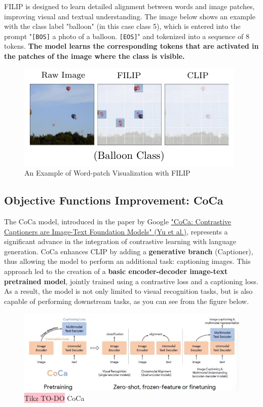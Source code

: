 FILIP is designed to learn detailed alignment between words and image patches, improving visual and textual understanding. The image below shows an example with the class label "balloon" (in this case class 5), which is entered into the prompt "\texttt{[BOS]} a photo of a balloon. \texttt{[EOS]}" and tokenized into a sequence of 8 tokens. \textbf{The model learns the corresponding tokens that are activated in the patches of the image where the class is visible.} 

\begin{figure}[!htbp]
    \centering
    \includegraphics[width=0.8\linewidth]{tikz/chapter11 - FILIP vs CLIP.pdf}
    \caption{An Example of Word-patch Visualization with FILIP}
\end{figure}


\subsection{Objective Functions Improvement: CoCa}

The CoCa model, introduced in the paper by Google \href{https://arxiv.org/pdf/2205.01917}{"CoCa: Contrastive Captioners are Image-Text Foundation Models" (Yu et al.)}, represents a significant advance in the integration of contrastive learning with language generation. CoCa enhances CLIP by adding a \textbf{generative branch} (Captioner), thus allowing the model to perform an additional task: captioning images. This approach led to the creation of a \textbf{basic encoder-decoder image-text pretrained model}, jointly trained using a contrastive loss and a captioning loss. As a result, the model is not only limited to visual recognition tasks, but is also capable of performing downstream tasks, as you can see from the figure below.

\begin{figure}[!htbp]
    \centering
    \includegraphics[width=\linewidth]{tikz/chapter11 - CoCa.png}
    \caption{{\color{red}\colorbox{pink}{Tikz TO-DO}} CoCa}
\end{figure}

